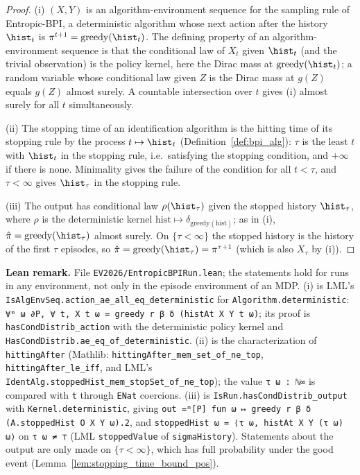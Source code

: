 \begin{proof}
\leanok
(i) $(X, Y)$ is an algorithm-environment sequence for the sampling rule of Entropic-BPI, a
deterministic algorithm whose next action after the history $\hist_t$ is $\pi^{t+1} = \mathrm{greedy}(\hist_t)$.
The defining property of an algorithm-environment sequence is that the conditional law of
$X_t$ given $\hist_t$ (and the trivial observation) is the policy kernel, here the Dirac mass
at $\mathrm{greedy}(\hist_t)$; a random variable whose conditional law given $Z$ is the Dirac mass
at $g(Z)$ equals $g(Z)$ almost surely. A countable intersection over $t$ gives (i) almost
surely for all $t$ simultaneously.

(ii) The stopping time of an identification algorithm is the hitting time of its stopping rule
by the process $t \mapsto \hist_t$ (Definition~\ref{def:bpi_alg}): $\tau$ is the least $t$ with
$\hist_t$ in the stopping rule, i.e.\ satisfying the stopping condition, and $+\infty$ if there is
none. Minimality gives the failure of the condition for all $t < \tau$, and $\tau < \infty$ gives
$\hist_\tau$ in the stopping rule.

(iii) The output has conditional law $\rho(\hist_\tau)$ given the stopped history $\hist_\tau$,
where $\rho$ is the deterministic kernel $\mathrm{hist} \mapsto \delta_{\mathrm{greedy}(\mathrm{hist})}$; as in (i),
$\hat\pi = \mathrm{greedy}(\hist_\tau)$ almost surely. On $\{\tau < \infty\}$ the stopped history is the
history of the first $\tau$ episodes, so $\hat\pi = \mathrm{greedy}(\hist_\tau) = \pi^{\tau + 1}$
(which is also $X_\tau$ by (i)).
\end{proof}

\textbf{Lean remark.} File \texttt{EV2026/EntropicBPIRun.lean}; the statements hold for runs in
any environment, not only in the episode environment of an MDP. (i) is LML's
\texttt{IsAlgEnvSeq.action\_ae\_all\_eq\_deterministic} for \texttt{Algorithm.deterministic}: \texttt{∀ᵐ ω ∂P, ∀ t, X t ω = greedy r β δ (histAt X Y t ω)};
its proof is \texttt{hasCondDistrib\_action} with the deterministic policy kernel and
\texttt{HasCondDistrib.ae\_eq\_of\_deterministic}. (ii) is the characterization of
\texttt{hittingAfter} (Mathlib: \texttt{hittingAfter\_mem\_set\_of\_ne\_top},
\texttt{hittingAfter\_le\_iff}, and LML's \texttt{IdentAlg.stoppedHist\_mem\_stopSet\_of\_ne\_top});
the value \texttt{τ ω : ℕ∞} is compared with \texttt{t} through \texttt{ENat} coercions. (iii)
is \texttt{IsRun.hasCondDistrib\_output} with \texttt{Kernel.deterministic}, giving
\texttt{out =ᵐ[P] fun ω ↦ greedy r β δ (A.stoppedHist O X Y ω).2}, and
\texttt{stoppedHist ω = ⟨τ ω, histAt X Y (τ ω) ω⟩} on \texttt{τ ω ≠ ⊤} (LML
\texttt{stoppedValue} of \texttt{sigmaHistory}). Statements about the output are only made on
$\{\tau < \infty\}$, which has full probability under the good event
(Lemma~\ref{lem:stopping_time_bound_pos}).

